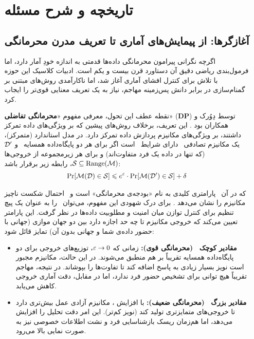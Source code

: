 \section{تاریخچه و شرح مسئله}
\label{sec:intro:lit-review}
\subsection{آغازگرها: از پیمایش‌های آماری تا تعریف مدرن محرمانگی}
\label{sec:lit:foundations}

اگرچه نگرانی پیرامون محرمانگی داده‌ها قدمتی به اندازه خودِ آمار دارد، اما فرمول‌بندی ریاضی دقیق آن دستاورد قرن بیست و یکم است. ادبیات کلاسیک این حوزه با تلاش برای {کنترل افشای آماری} آغاز شد، اما ناکارآمدی روش‌های مبتنی بر گمنام‌سازی در برابر دانش پس‌زمینه مهاجم، نیاز به یک تعریف معنایی قوی‌تر را ایجاب کرد.

نقطه عطف این تحول، معرفی مفهوم «\textbf{محرمانگی تفاضلی}» (\textbf{DP}) توسط دِوُرک و همکاران بود \cite{dwork2006differential}. این تعریف، برخلاف روش‌های پیشین که بر ویژگی‌های داده تمرکز داشتند، بر ویژگی‌های مکانیزم پردازش داده تمرکز دارد. در مدل استاندارد (متمرکز)، یک مکانیزم تصادفی \mech \ دارای شرایط \DP \ است اگر برای هر دو پایگاه‌داده همسایه \Dset \ و $\Dset'$ (که تنها در داده یک فرد متفاوت‌اند) و برای هر زیرمجموعه از خروجی‌ها $\mathcal{S} \subseteq \mathrm{Range}(\mech)$، رابطه زیر برقرار باشد:
\begin{equation}
\label{eq:dp-def-lit}
\Pr[\mech(\Dset) \in \mathcal{S}] \le e^{\eps} \cdot \Pr[\mech(\Dset') \in \mathcal{S}] + \del
\end{equation}

که در آن \eps \ پارامتری کلیدی به نام «بودجه‌ی محرمانگی» است و \del \ احتمال شکست ناچیز مکانیزم را نشان می‌دهد \cite{dwork2014roth}.
برای درک شهودی این مفهوم، می‌توان \eps \ را به عنوان یک پیچ تنظیم برای کنترل توازن میان امنیت و مطلوبیت داده‌ها در نظر گرفت. این پارامتر تعیین می‌کند که خروجی مکانیزم تا چه حد اجازه دارد بین دو جهان موازی (جهانی با حضور داده‌ی شما و جهانی بدون آن) تمایز قائل شود:
\begin{itemize}
    \item \textbf{مقادیر کوچک \eps \ (محرمانگی قوی):} زمانی که $\varepsilon \to 0$، توزیع‌های خروجی برای دو پایگاه‌داده همسایه تقریباً بر هم منطبق می‌شوند. در این حالت، مکانیزم مجبور است نویز بسیار زیادی به پاسخ اضافه کند تا تفاوت‌ها را بپوشاند. در نتیجه، مهاجم تقریباً هیچ توانی برای تشخیص حضور فرد ندارد، اما در مقابل، دقت آماری خروجی کاهش می‌یابد.
    \item \textbf{مقادیر بزرگ \eps \ (محرمانگی ضعیف):} با افزایش \eps، مکانیزم آزادی عمل بیش‌تری دارد تا خروجی‌های متمایزتری تولید کند (نویز کم‌تر). این امر دقت تحلیل را افزایش می‌دهد، اما هم‌زمان ریسک بازشناسایی فرد و نشت اطلاعات خصوصی نیز به صورت نمایی بالا می‌رود.
\end{itemize}

